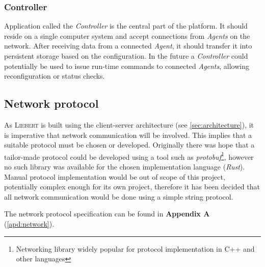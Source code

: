         \subsubsection{Controller}
            Application called the \textit{Controller} is the central part of the platform. It should reside on a single computer system and accept connections from \textit{Agents} on the network. After receiving data from a connected \textit{Agent}, it should transfer it into persistent storage based on the configuration. In the future a \textit{Controller} could potentially be used to issue run-time commands to connected \textit{Agents}, allowing reconfiguration or status checks.
            
    \subsection{Network protocol}
        As \textsc{Liebert} is built using the client-server architecture (see \autoref{sec:architecture}), it is imperative that network communication will be involved. This implies that a suitable protocol must be chosen or developed. Originally there was hope that a tailor-made protocol could be developed using a tool such as  \textit{protobuf}\footnote{Networking library widely popular for protocol implementation in C++ and other languages}, however no such library was available for the chosen implementation language (\textit{Rust}). Manual protocol implementation would be out of scope of this project, potentially complex enough for its own project, therefore it has been decided that all network communication would be done using a simple string protocol.
        
        The network protocol specification can be found in \textbf{Appendix A} (\autoref{apd:network}).
        